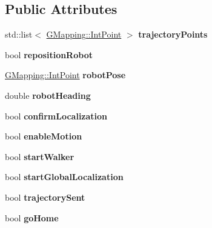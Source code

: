 \subsection*{Public Attributes}
\begin{DoxyCompactItemize}
\item 
\mbox{\label{classQNavigatorWidget_ae406349fc8a59e4ebbe73b6c2230cfbc}} 
std\+::list$<$ \hyperlink{structGMapping_1_1point}{G\+Mapping\+::\+Int\+Point} $>$ {\bfseries trajectory\+Points}
\item 
\mbox{\label{classQNavigatorWidget_a20030046d36fcc80683076d921f48922}} 
bool {\bfseries reposition\+Robot}
\item 
\mbox{\label{classQNavigatorWidget_a19a1948956129ed7ddbe2dc85defe310}} 
\hyperlink{structGMapping_1_1point}{G\+Mapping\+::\+Int\+Point} {\bfseries robot\+Pose}
\item 
\mbox{\label{classQNavigatorWidget_a33b709acdd3159e96797ab78463d7456}} 
double {\bfseries robot\+Heading}
\item 
\mbox{\label{classQNavigatorWidget_a99cc73e455fdc6b642c991827f228eb3}} 
bool {\bfseries confirm\+Localization}
\item 
\mbox{\label{classQNavigatorWidget_af1f4b55931f18046cbed6628580fb899}} 
bool {\bfseries enable\+Motion}
\item 
\mbox{\label{classQNavigatorWidget_ae036db9f629bdb155bbbd4afd17e0101}} 
bool {\bfseries start\+Walker}
\item 
\mbox{\label{classQNavigatorWidget_a7e66f707a396cb3e725d2cfddec5b181}} 
bool {\bfseries start\+Global\+Localization}
\item 
\mbox{\label{classQNavigatorWidget_ad1c20a23fe7d17e6b67d0ba251a4a086}} 
bool {\bfseries trajectory\+Sent}
\item 
\mbox{\label{classQNavigatorWidget_a8fa4fd567d576d178799cfa92121ca01}} 
bool {\bfseries go\+Home}

\end{DoxyCompactItemize}
